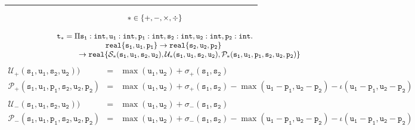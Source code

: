 

\begin{figure}[tb]
\hrule			
$$
\begin{array}{c}
\ast\in\{ +,-,\times,\div\}\\
\\
\mathtt{t_\ast} = \Pi \mathtt{s_1}:\texttt{int},\mathtt{u_1}:\texttt{int}, \mathtt{p_1}:\texttt{int},\mathtt{s_2}:\texttt{int}, \mathtt{u_2}:\texttt{int}, \mathtt{p_2}:\texttt{int}.\\
\hspace{0.8cm}\F{s_1}{u_1}{p_1}\rightarrow\F{s_2}{u_2}{p_2}\\
\hspace{3.2cm}
\rightarrow\F{\mathcal{S}_\ast(\mathtt{s_1},\mathtt{u_1},\mathtt{s_2},\mathtt{u_2})}
{\mathcal{U}_\ast(\mathtt{s_1},\mathtt{u_1},\mathtt{s_2},\mathtt{u_2})}
{\mathcal{P}_\ast(\mathtt{s_1},\mathtt{u_1},\mathtt{p_1},\mathtt{s_2},\mathtt{u_2},\mathtt{p_2})}
\end{array}
$$
$$
\begin{array}{rcl}
\mathcal{U}_+(\mathtt{s_1},\mathtt{u_1},\mathtt{s_2},\mathtt{u_2}))&=&\max(\mathtt{u_1},\mathtt{u_2})
+\sigma_+(\mathtt{s_1},\mathtt{s_2})\\
\mathcal{P}_+(\mathtt{s_1},\mathtt{u_1},\mathtt{p_1},\mathtt{s_2},\mathtt{u_2},\mathtt{p_2}) &=&
\max(\mathtt{u_1},\mathtt{u_2})+\sigma_+(\mathtt{s_1},\mathtt{s_2})-
   \max(\mathtt{u_1}-\mathtt{p_1},\mathtt{u_2}-\mathtt{p_2})-\iota(\mathtt{u_1}-\mathtt{p_1},\mathtt{u_2}-\mathtt{p_2})\\
   \\
\mathcal{U}_-(\mathtt{s_1},\mathtt{u_1},\mathtt{s_2},\mathtt{u_2})) &=&\max(\mathtt{u_1},\mathtt{u_2})
+\sigma_-(\mathtt{s_1},\mathtt{s_2})\\
\mathcal{P}_-(\mathtt{s_1},\mathtt{u_1},\mathtt{p_1},\mathtt{s_2},\mathtt{u_2},\mathtt{p_2}) &=&
\max(\mathtt{u_1},\mathtt{u_2})+\sigma_-(\mathtt{s_1},\mathtt{s_2})-
   \max(\mathtt{u_1}-\mathtt{p_1},\mathtt{u_2}-\mathtt{p_2})-\iota(\mathtt{u_1}-\mathtt{p_1},\mathtt{u_2}-\mathtt{p_2})\\

\end{array}$$
\end{figure}
